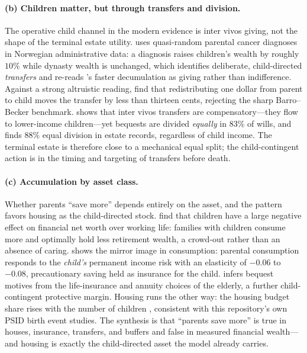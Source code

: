 \documentclass[10pt]{article}
\begin{document}
\paragraph{(b) Children matter, but through transfers and division.} The
operative child channel in the modern evidence is inter vivos giving, not the
shape of the terminal estate utility. \citet{kvaerner2023} uses quasi-random
parental cancer diagnoses in Norwegian administrative data: a diagnosis raises
children's wealth by roughly $10\%$ while dynasty wealth is unchanged, which
identifies deliberate, child-directed \emph{transfers} and re-reads
\citeauthor{hurd1989}'s faster decumulation as giving rather than
indifference. Against a strong altruistic reading, \citet{altonji1997} find
that redistributing one dollar from parent to child moves the transfer by less
than thirteen cents, rejecting the sharp Barro--Becker benchmark.
\citet{mcgarry1999} shows that inter vivos transfers are compensatory---they
flow to lower-income children---yet bequests are divided \emph{equally} in
$83\%$ of wills, and \citet{wilhelm1996} finds $88\%$ equal division in estate
records, regardless of child income. The terminal estate is therefore close to
a mechanical equal split; the child-contingent action is in the timing and
targeting of transfers before death.

\paragraph{(c) Accumulation by asset class.} Whether parents ``save more''
depends entirely on the asset, and the pattern favors housing as the
child-directed stock. \citet{scholzseshadri} find that children have a large
negative effect on financial net worth over working life: families with
children consume more and optimally hold less retirement wealth, a crowd-out
rather than an absence of caring. \citet{boar2021} shows the mirror image in
consumption: parental consumption responds to the \emph{child's} permanent
income risk with an elasticity of $-0.06$ to $-0.08$, precautionary saving
held as insurance for the child. \citet{bernheim1991} infers bequest motives
from the life-insurance and annuity choices of the elderly, a further
child-contingent protective margin. Housing runs the other way: the housing
budget share rises with the number of children
\citep{coeurdacier2023}, consistent with this repository's own PSID
birth event studies. The synthesis is that ``parents save more'' is true in
houses, insurance, transfers, and buffers and false in measured financial
wealth---and housing is exactly the child-directed asset the model already
carries.
\end{document}
